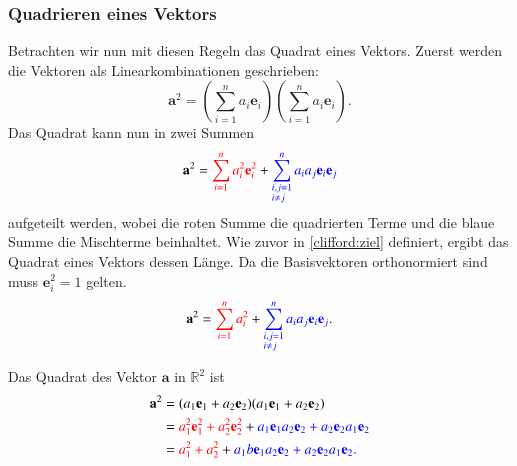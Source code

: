 \subsubsection{Quadrieren eines Vektors}
Betrachten wir nun mit diesen Regeln das Quadrat eines Vektors. Zuerst werden die Vektoren als Linearkombinationen geschrieben:
\begin{equation}
	    \textbf{a}^2 = 
		\left ( 
		\sum_{i=1}^{n} a_i \textbf{e}_i 
		\right ) 
		\left ( 
		\sum_{i=1}^{n} a_i \textbf{e}_i 
		\right )
		\label{eq:quad_a_1}.
\end{equation}
Das Quadrat kann nun in zwei Summen 
\begin{equation}
	\textbf{a}^2 =
	\textcolor{red}{\sum_{i=1}^{n} a_i^2\textbf{e}_i^2} 
	+ 
	\textcolor{blue}{\sum_{\begin{subarray}{l}i,j=1\\i \neq j\end{subarray}}^n  a_ia_j\textbf{e}_i\textbf{e}_j } 
	\label{eq:quad_a_2}
\end{equation}
aufgeteilt werden, wobei die roten Summe die quadrierten Terme und die blaue Summe die Mischterme beinhaltet.
Wie zuvor in \ref{clifford:ziel} definiert, ergibt das Quadrat eines Vektors dessen Länge. Da die Basisvektoren orthonormiert sind muss $\textbf{e}_i^2 = 1$ gelten.
\begin{equation}
	\textbf{a}^2 = \textcolor{red}{\sum_{i=1}^{n} a_i^2} + \textcolor{blue}{\sum_{\begin{subarray}{l}i,j=1\\i \neq j\end{subarray}}^n  a_ia_j\textbf{e}_i\textbf{e}_j}.
	\label{eq:quad_a_3}
\end{equation}
\begin{beispiel}
Das Quadrat des Vektor $\textbf{a}$ in $\mathbb{R}^2$ ist
\begin{equation}
    \begin{split}
    \textbf{a}^2 
    &= (a_1\textbf{e}_1+a_2\textbf{e}_2)(a_1\textbf{e}_1+a_2\textbf{e}_2) \\\
    &= \textcolor{red}{a_1^2\textbf{e}_1^2 + a_2^2\textbf{e}_2^2} 
    + \textcolor{blue}{a_1\textbf{e}_1a_2\textbf{e}_2 + a_2\textbf{e}_2a_1\textbf{e}_2}   \\\
    & = \textcolor{red}{a_1^2 + a_2^2} + \textcolor{blue}{a_1b\textbf{e}_1a_2\textbf{e}_2 + a_2\textbf{e}_2a_1\textbf{e}_2}.
    \end{split}
\end{equation}
\end{beispiel}

